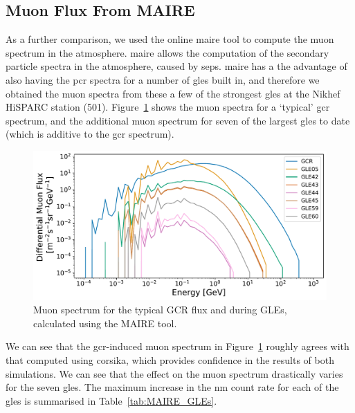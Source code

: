 \subsection{Muon Flux From MAIRE}\label{sec:MAIRE_flux}

As a further comparison, we used the online \gls{maire} tool to compute the muon spectrum in the atmosphere. \gls{maire} allows the computation of the secondary particle spectra in the atmosphere, caused by \glspl{sep}. \gls{maire} has a the advantage of also having the \gls{pcr} spectra for a number of \glspl{gle} built in, and therefore we obtained the muon spectra from these a few of the strongest \glspl{gle} at the Nikhef HiSPARC station (501). Figure~\ref{fig:MAIRE_muon_spectra} shows the muon spectra for a `typical' \gls{gcr} spectrum, and the additional muon spectrum for seven of the largest \glspl{gle} to date (which is additive to the \gls{gcr} spectrum).


\begin{figure}[ht!]
	\centering
	\includegraphics[width=\columnwidth]{MAIRE_Muon_Diff_Flux.pdf}
	\caption{Muon spectrum for the typical GCR flux and during GLEs, calculated using the MAIRE tool.}
	\label{fig:MAIRE_muon_spectra}
\end{figure}

We can see that the \gls{gcr}-induced muon spectrum in Figure~\ref{fig:MAIRE_muon_spectra} roughly agrees with that computed using \gls{corsika}, which provides confidence in the results of both simulations. We can see that the effect on the muon spectrum drastically varies for the seven \glspl{gle}. The maximum increase in the \gls{nm} count rate for each of the \glspl{gle} is summarised in Table~\ref{tab:MAIRE_GLEs}. 


